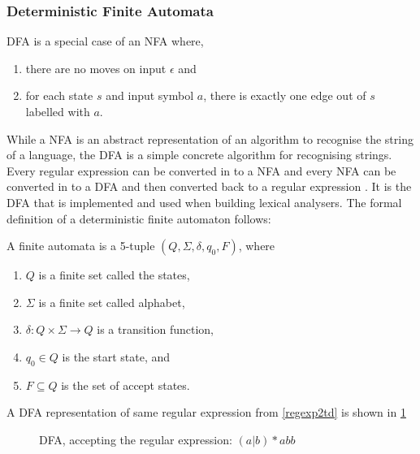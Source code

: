 \subsubsection{Deterministic Finite Automata}
DFA is a special case of an NFA where,
\begin{enumerate}
  \item there are no moves on input $\epsilon$ and
  \item for each state $s$ and input symbol $a$, there is exactly one edge out
        of $s$ labelled with $a$.
\end{enumerate}
While a NFA is an abstract representation of an algorithm to recognise the string 
of a language, the DFA is a simple concrete algorithm for recognising strings. 
Every regular expression can be converted in to a NFA and every NFA can be 
converted in to a DFA and then converted back to a regular expression \cite{Aho2006}. 
It is the DFA that is implemented and used when building lexical analysers.
The formal definition of a deterministic finite automaton follows:
\begin{definition} \label{finiteAutomataDef}
A finite automata is a 5-tuple $(Q, \Sigma, \delta, q_0, F)$, where
\begin{enumerate}
  \item $Q$ is a finite set called the states,
  \item $\Sigma$ is a finite set called alphabet,
  \item $\delta: Q \times \Sigma \to Q$ is a transition function,
  \item $q_0 \in Q$ is the start state, and
  \item $F \subseteq Q$ is the set of accept states.
\end{enumerate} 
\end{definition}
\begin{example} \label{regexp2dfa}
A DFA representation of same regular expression from \cref{regexp2td} is shown in \cref{fig:dfa}
\end{example}
\begin{figure}[!h]
  \centering
  \caption{DFA, accepting the regular expression: $(a | b)* abb$
  \label{fig:dfa}}
\end{figure}

 
